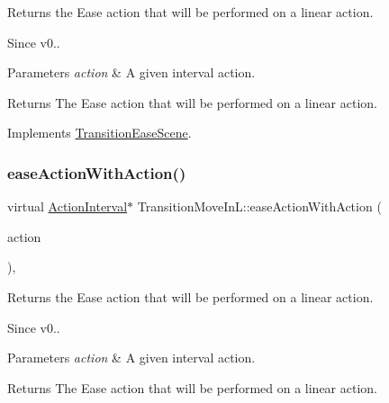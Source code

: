 Returns the Ease action that will be performed on a linear action. \begin{DoxySince}{Since}
v0..
\end{DoxySince}

\begin{DoxyParams}{Parameters}
{\em action} & A given interval action. \\
\hline
\end{DoxyParams}
\begin{DoxyReturn}{Returns}
The Ease action that will be performed on a linear action. 
\end{DoxyReturn}


Implements \hyperlink{classTransitionEaseScene_a6f27540600b0d703ed30adc8976e65df}{Transition\+Ease\+Scene}.

\mbox{\label{classTransitionMoveInL_a298883652b158cc690f487c011b75255}} 
\subsubsection{\texorpdfstring{ease\+Action\+With\+Action()}{easeActionWithAction()}\hspace{0.1cm}{\footnotesize\ttfamily [2/2]}}
{\footnotesize\ttfamily virtual \hyperlink{classActionInterval}{Action\+Interval}$\ast$ Transition\+Move\+In\+L\+::ease\+Action\+With\+Action (\begin{DoxyParamCaption}\item[{\hyperlink{classActionInterval}{Action\+Interval} $\ast$}]{action }\end{DoxyParamCaption})\hspace{0.3cm}{\ttfamily [override]}, {\ttfamily [virtual]}}

Returns the Ease action that will be performed on a linear action. \begin{DoxySince}{Since}
v0..
\end{DoxySince}

\begin{DoxyParams}{Parameters}
{\em action} & A given interval action. \\
\hline
\end{DoxyParams}
\begin{DoxyReturn}{Returns}
The Ease action that will be performed on a linear action. 
\end{DoxyReturn}


